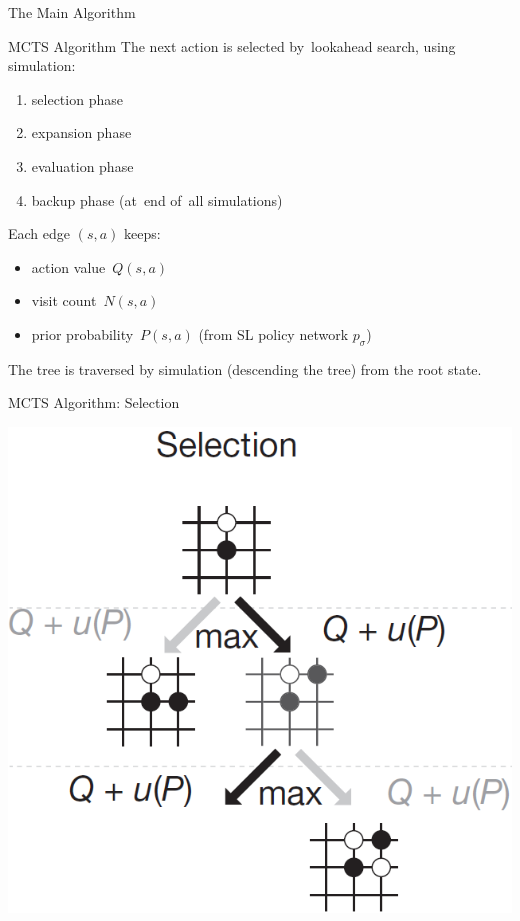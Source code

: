 \documentclass{beamer}
\begin{document}
{    \begin{frame}[standout]
      The Main Algorithm
    \end{frame}

    \begin{frame}{MCTS Algorithm}
      The next action is selected by~lookahead search, using simulation:
      \pause
      \begin{enumerate}[<+- | alert@+>]
        \item selection phase
        \item expansion phase
        \item evaluation phase
        \item backup phase (at~end of~all simulations)
      \end{enumerate}
      \pause

      Each edge $(s, a)$ keeps:
      \begin{itemize}[<+- | alert@+>]
        \item action value~$Q(s, a)$
        \item visit count~$N(s, a)$
        \item prior probability~$P(s, a)$ (from SL policy network $p_\sigma$)
      \end{itemize}
      \pause

      The tree is traversed by simulation (descending the tree) from the root state.
    \end{frame}

    \begin{frame}{MCTS Algorithm: Selection}
      \begin{center}
        \includegraphics[height=.6\textheight]{../img/MCTS_selection.png}
      \end{center}
      \pause


\end{frame}}
\end{document}

